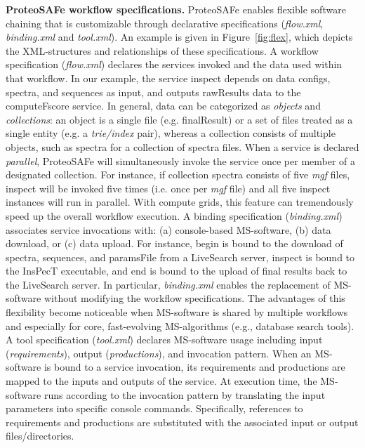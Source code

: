 \documentclass[arial,11pt]{article}
\newcommand{\SF}[1]{\textsf{#1}}
\newcommand{\SYSTEM}[0]{\SF{ProteoSAFe}\xspace}
\newcommand{\LiveSearch}[0]{\SF{LiveSearch}\xspace}
\begin{document}
{\bf \SYSTEM workflow specifications.} \SYSTEM enables flexible software chaining that is customizable through declarative specifications ({\em  flow.xml}, {\em  binding.xml} and {\em  tool.xml}). An example is given in Figure~\ref{fig:flex}, which depicts the XML-structures and relationships of these specifications.
%
A workflow specification ({\em  flow.xml}) declares the services invoked and the data used within that workflow.
In our example, the service \SF{inspect} depends on data \SF{configs}, \SF{spectra}, and \SF{sequences} as input,
and outputs \SF{rawResults} data to the \SF{computeFscore} service. In general, data can be categorized as {\em  objects} and {\em  collections}: an object is a single file (e.g. \SF{finalResult}) or a set of files treated as a single entity (e.g. a {\em  trie/index} pair), whereas a collection consists of multiple objects, such as \SF{spectra} for a collection of spectra files. When a service is declared {\em  parallel}, \SYSTEM will simultaneously invoke the service once per member of a designated collection. For instance, if collection \SF{spectra} consists of five {\em  mgf} files, \SF{inspect} will be invoked five times (i.e. once per {\em  mgf} file) and all five \SF{inspect} instances will run in parallel. With compute grids, this feature  can tremendously speed up the overall workflow execution.
%
A binding specification ({\em  binding.xml}) associates service invocations with: (a) console-based MS-software, (b) data download, or (c) data upload. For instance, \SF{begin} is bound to the download of \SF{spectra}, \SF{sequences}, and \SF{paramsFile} from a \LiveSearch server, \SF{inspect} is bound to the InsPecT executable, and \SF{end} is bound to the upload of final results back to the \LiveSearch server. In particular, {\em  binding.xml} enables the replacement of MS-software without modifying the workflow specifications. The advantages of this flexibility become noticeable when MS-software is shared by multiple workflows and especially for core, fast-evolving MS-algorithms (e.g., database search tools).
%
A tool specification ({\em  tool.xml}) declares MS-software usage including input ({\em  requirements}), output ({\em  productions}), and invocation pattern.
When an MS-software is bound to a service invocation, its requirements and productions are mapped to the inputs and outputs of the service.
At execution time, the MS-software runs according to the invocation pattern by translating the input parameters into specific console commands.
Specifically, references to requirements and productions are substituted with the associated input or output files/directories.
\end{document}
